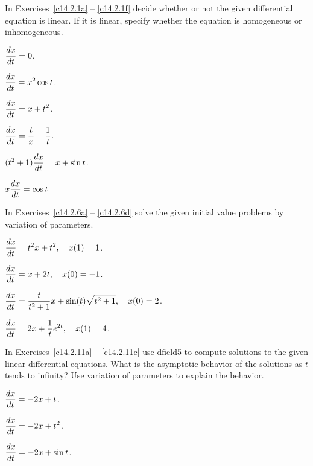 \documentclass{ximera}
\begin{document}
\noindent In Exercises~\ref{c14.2.1a} -- \ref{c14.2.1f} decide whether 
or not the given differential equation is linear.  If it is linear, 
specify whether the equation is homogeneous or inhomogeneous.
\begin{exercise}  \label{c14.2.1a}
$\displaystyle \frac{dx}{dt} = 0$.
\end{exercise}
\begin{exercise}  \label{c14.2.1b}
$\displaystyle \frac{dx}{dt} = x^2\cos t$.
\end{exercise}
\begin{exercise}  \label{c14.2.1c}
$\displaystyle \frac{dx}{dt} = x+t^2$.
\end{exercise}
\begin{exercise}  \label{c14.2.1d}
$\displaystyle \frac{dx}{dt} = \frac{t}{x}-\frac{1}{t}$.
\end{exercise}
\begin{exercise}  \label{c14.2.1e}
$\displaystyle (t^2+1)\frac{dx}{dt} = x+\sin t$.
\end{exercise}
\begin{exercise} \label{c14.2.1f}
$\displaystyle x\frac{dx}{dt} = \cos t$
\end{exercise}

\noindent In Exercises~\ref{c14.2.6a} -- \ref{c14.2.6d} solve the given 
initial value problems by variation of parameters.
\begin{exercise}   \label{c14.2.6a}
$\displaystyle \frac{dx}{dt} = t^2 x + t^2, \quad x(1)=1$.
\end{exercise}
\begin{exercise}   \label{c14.2.6b}
$\displaystyle \frac{dx}{dt} = x+2t, \quad x(0)=-1$.
\end{exercise}
\begin{exercise}   \label{c14.2.6c}
$\displaystyle \frac{dx}{dt} = 
\frac{t}{t^2+1}x+\sin(t)\sqrt{t^2+1},\quad x(0)=2$.
\end{exercise}
\begin{exercise}   \label{c14.2.6d}
$\displaystyle \frac{dx}{dt} = 2x+\frac{1}{t}e^{2t}, \quad x(1)=4$.
\end{exercise}



\CEXER

\noindent In Exercises~\ref{c14.2.11a} -- \ref{c14.2.11c} use 
{\sf dfield5} 
to compute solutions to the given linear differential equations.  What is 
the asymptotic behavior of the solutions as $t$ tends to infinity?  Use 
variation of parameters to explain the behavior.
\begin{exercise}   \label{c14.2.11a}
$\displaystyle\frac{dx}{dt} = -2 x + t$.
\end{exercise}
\begin{exercise}   \label{c14.2.11b}
$\displaystyle\frac{dx}{dt} = -2 x + t^2$.
\end{exercise}
\begin{exercise}   \label{c14.2.11c}
$\displaystyle\frac{dx}{dt} = -2 x + \sin t$.
\end{exercise}
\end{document}
